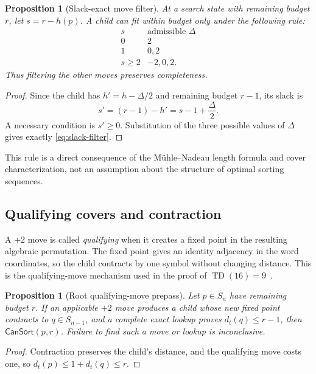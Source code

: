 \documentclass[11pt]{article}
\newtheorem{proposition}[theorem]{Proposition}
\theoremstyle{definition}
\theoremstyle{remark}
\newcommand{\TD}{\operatorname{TD}}
\newcommand{\dist}{d_t}
\newcommand{\CanSort}{\mathsf{CanSort}}
\begin{document}
\begin{proposition}[Slack-exact move filter]
\label{prop:slack}
At a search state with remaining budget $r$, let $s=r-h(p)$.  A child can fit
within budget only under the following rule:
\[
\begin{array}{c|c}
  s & \text{admissible }\Delta\\ \hline
  0 & 2\\
  1 & 0,2\\
  s\geq2 & -2,0,2.
\end{array}                                      \tag{6.2}\label{eq:slack-filter}
\]
Thus filtering the other moves preserves completeness.
\end{proposition}

\begin{proof}
Since the child has
$h'=h-\Delta/2$ and remaining budget $r-1$, its slack is
\[
  s'=(r-1)-h'=s-1+\frac{\Delta}{2}.              \tag{6.3}
\]
A necessary condition is $s'\geq0$.  Substitution of the three possible
values of $\Delta$ gives exactly \eqref{eq:slack-filter}.
\end{proof}

This rule is a direct consequence of the M\"uhle--Nadeau length formula and
cover characterization, not an assumption about the structure of optimal
sorting sequences.

\subsection{Qualifying covers and contraction}

A $+2$ move is called \emph{qualifying} when it creates a fixed point in the
resulting algebraic permutation.  The fixed point gives an identity adjacency
in the word coordinates, so the child contracts by one symbol without changing
distance.  This is the qualifying-move mechanism used in the proof of
$\TD(16)=9$~\cite[Lemma~7.2]{SilvaEtAl2026}.

\begin{proposition}[Root qualifying-move prepass]
\label{prop:qualifying-prepass}
Let $p\in S_n$ have remaining budget $r$.  If an applicable $+2$ move produces
a child whose new fixed point contracts to $q\in S_{n-1}$, and a complete
exact lookup proves $\dist(q)\leq r-1$, then $\CanSort(p,r)$.
Failure to find such a move or lookup is inconclusive.
\end{proposition}

\begin{proof}
Contraction preserves the child's distance, and the qualifying move costs one,
so $\dist(p)\leq1+\dist(q)\leq r$.
\end{proof}
\end{document}

